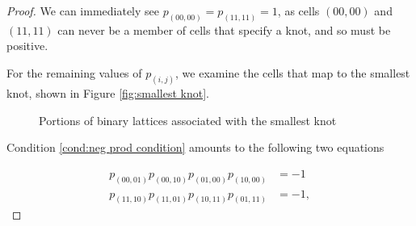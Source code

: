 \documentclass[12pt]{article}
\theoremstyle{plain}
\theoremstyle{definition}
\theoremstyle{remark}
\theoremstyle{definition}
\newcommand{\cell}[4]{ \draw[thick] ( #1 , #2 ) rectangle ( #3 , #4 );}
\newcommand{\lablnode}[3]{\node[shape=circle,draw=none,fill=none, inner sep=0pt,minimum size=0pt] (A) at ( #1 , #2 ) {#3};}
\newcommand{\lablvertex}[3]{\node[shape=circle,draw=none,fill=white, inner sep=2pt,minimum size=5pt] (A) at ( #1 , #2 ) {#3};}
\begin{document}
\begin{proof}

We can immediately see $p_{(00,00)} = p_{(11,11)} = 1$, as cells $(00,00)$ and $(11,11)$ can never be a member of cells that specify a knot, and so must be positive.

For the remaining values of $p_{(i,j)}$, we examine the cells that map to the smallest knot, shown in Figure \ref{fig:smallest knot}. 

\begin{figure}[h!]
\begin{center}
\end{center}
\caption{Portions of binary lattices associated with the smallest knot}
\label{fig:constraints i and ii}
\end{figure}

Condition \ref{cond:neg prod condition} amounts to the following two equations

\begin{equation}
  \begin{aligned}
  p_{(00,01)} p_{(00,10)} p_{(01,00)} p_{(10,00)} & = -1  \\
  p_{(11,10)} p_{(11,01)} p_{(10,11)} p_{(01,11)} & = -1,
  \end{aligned}
  \label{eq:constraints i and ii}
\end{equation}


\end{proof}
\end{document}
